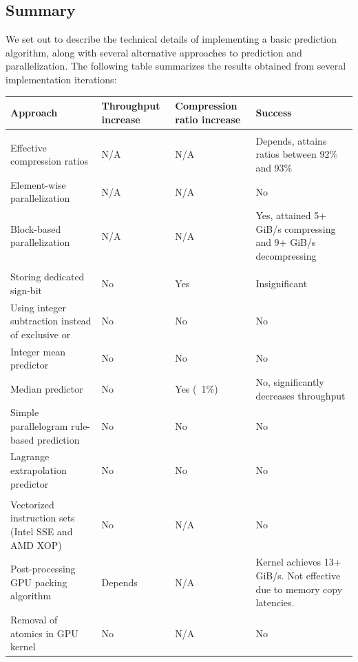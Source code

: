   \subsection{Summary}
  We set out to describe the technical details of implementing a basic prediction algorithm, along with several alternative approaches to prediction and parallelization. The following
  table summarizes the results obtained from several implementation iterations:
  \begin{tabular}{|p{}|p{}|p{}|p{}|}
   \hline
   \rowcolor[gray]{0.70}\textbf{Approach} & \textbf{Throughput increase} & \textbf{Compression ratio increase} & \textbf{Success}\\
   \hline
   \rowcolor[gray]{0.80}\multicolumn{4}{|l|}{\textbf{Basic compression and parallelization:}}\\
   \hline
   Effective compression ratios & N/A & N/A & Depends, attains ratios between 92\% and 93\% \\
   \hline
   Element-wise parallelization & N/A & N/A & No \\
   \hline
   Block-based parallelization & N/A & N/A & Yes, attained 5+ GiB/s compressing and 9+ GiB/s decompressing \\
   \hline
   \rowcolor[gray]{0.80}\multicolumn{4}{|l|}{\textbf{Alternative predictors:}}\\
   \hline
   Storing dedicated sign-bit & No & Yes & Insignificant \\
   \hline
   Using integer subtraction instead of exclusive or & No & No & No\\
   \hline
   Integer mean predictor & No & No & No\\
   \hline
   Median predictor & No & Yes (~1\%) & No, significantly decreases throughput\\
   \hline
   Simple parallelogram rule-based prediction & No & No & No\\
   \hline
   Lagrange extrapolation predictor & No & No & No\\
   \hline
   \rowcolor[gray]{0.80}\multicolumn{4}{|l|}{\textbf{Advanced parallelization techniques}}\\
   \hline
   Vectorized instruction sets (Intel SSE and AMD XOP) & No & N/A & No\\
   \hline
   Post-processing GPU packing algorithm & Depends & N/A & Kernel achieves 13+ GiB/s. Not effective due to memory copy latencies.\\
   \hline
   Removal of atomics in GPU kernel & No & N/A & No\\
   \hline
  \end{tabular}

